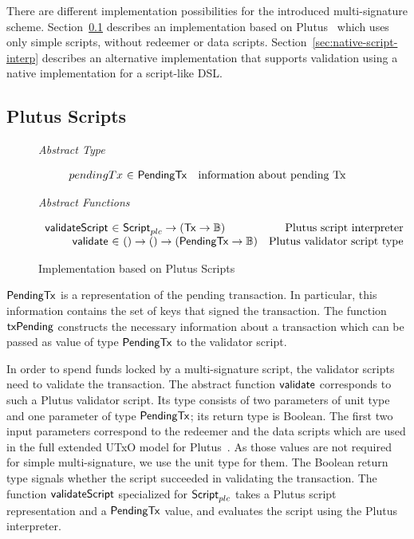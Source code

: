 \documentclass[11pt,a4paper,dvipsnames]{article}
\newcommand{\Bool}{\ensuremath{\mathbb{B}}}
\newcommand{\Tx}{\type{Tx}}
\newcommand{\Script}{\type{Script}}
\newcommand{\ScriptPlutus}{\Script_{plc}}
\newcommand{\PendingTx}{\type{PendingTx}}
\theoremstyle{definition}
\begin{document}
There are different implementation possibilities for the introduced
multi-signature scheme. Section~\ref{sec:plutus-scripts} describes an
implementation based on Plutus~\cite{plutus_eutxo} which uses only simple
scripts, without redeemer or data
scripts. Section~\ref{sec:native-script-interp} describes an alternative
implementation that supports validation using a
native implementation for a script-like DSL.

\subsection{Plutus Scripts}
\label{sec:plutus-scripts}

\begin{figure*}[hbt]
  \emph{Abstract Type}

  \begin{equation*}
    \begin{array}{r@{~\in~}lr}
      pendingTx & \PendingTx & \text{information about pending Tx}
    \end{array}
  \end{equation*}

  \emph{Abstract Functions}

  \begin{equation*}
    \begin{array}{r@{~\in~}lr}
      \fun{validateScript} & \ScriptPlutus \to (\Tx \to \Bool) & \text{Plutus script
                                                               interpreter} \\
      \fun{validate} & () \to () \to (\PendingTx \to \Bool) & \text{Plutus
                                                            validator script type}
    \end{array}
  \end{equation*}
  \caption{Implementation based on Plutus Scripts}
  \label{fig:types_defs_plutus}
\end{figure*}

$\PendingTx$ is a representation of the pending transaction. In particular, this
information contains the set of keys that signed the transaction. The function
$\mathsf{txPending}$ constructs the necessary information about a transaction
which can be passed as value of type $\PendingTx$ to the validator script.

In order to spend funds locked by a multi-signature script, the validator
scripts need to validate the transaction. The abstract function $\mathsf{validate}$
corresponds to such a Plutus validator script. Its type consists of two
parameters of unit type and one parameter of type $\PendingTx$; its return type
is Boolean. The first two input parameters correspond to the redeemer and the
data scripts which are used in the full extended UTxO model for
Plutus~\cite{plutus_eutxo}. As those values are not required for simple
multi-signature, we use the unit type for them. The Boolean return type signals
whether the script succeeded in validating the transaction. The function
$\mathsf{validateScript}$ specialized for $\ScriptPlutus$ takes a Plutus script
representation and a $\PendingTx$ value, and evaluates the script using the
Plutus interpreter.
\end{document}
